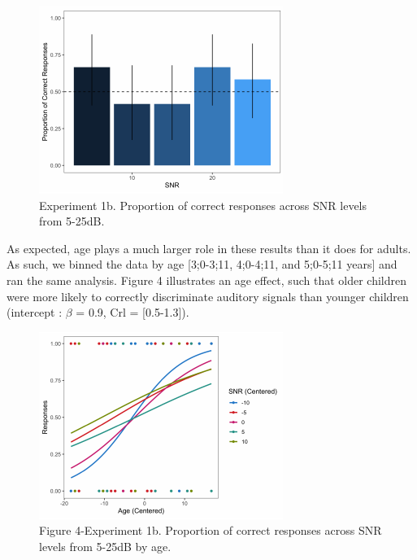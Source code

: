\documentclass[10pt, letterpaper]{article}
\newenvironment{CodeChunk}{}{}
\begin{document}
\begin{CodeChunk}
\begin{figure}[H]

{\centering \includegraphics{figs/image 3-1} 

}

\caption[Experiment 1b]{Experiment 1b. Proportion of correct responses across SNR levels from 5-25dB.}\label{fig:image 3}
\end{figure}
\end{CodeChunk}

As expected, age plays a much larger role in these results than it does
for adults. As such, we binned the data by age {[}3;0-3;11, 4;0-4;11,
and 5;0-5;11 years{]} and ran the same analysis. Figure 4 illustrates an
age effect, such that older children were more likely to correctly
discriminate auditory signals than younger children (intercept :
\(\beta\) = 0.9, Crl = {[}0.5-1.3{]}).

\begin{CodeChunk}
\begin{figure}[H]

{\centering \includegraphics{figs/image 4-1} 

}

\caption[Figure 4-Experiment 1b]{Figure 4-Experiment 1b. Proportion of correct responses across SNR levels from 5-25dB by age.}\label{fig:image 4}
\end{figure}
\end{CodeChunk}
\end{document}
